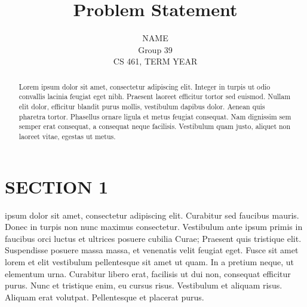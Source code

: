 \documentclass[10pt,peerreview,draftclsnofoot,onecolumn,final,margin=0.75in]{IEEEtran}
\begin{document}
\title{Problem Statement}

\author{NAME \\ Group 39 \\CS 461, TERM YEAR}

\maketitle

\begin{abstract}
Lorem ipsum dolor sit amet, consectetur adipiscing elit. Integer in turpis ut odio convallis 
lacinia feugiat eget nibh. Praesent laoreet efficitur tortor sed euismod. Nullam elit dolor, 
efficitur blandit purus mollis, vestibulum dapibus dolor. Aenean quis pharetra tortor. 
Phasellus ornare ligula et metus feugiat consequat. Nam dignissim sem semper erat consequat, 
a consequat neque facilisis. Vestibulum quam justo, aliquet non laoreet vitae, egestas ut metus.

\end{abstract}
\newpage

\ifCLASSOPTIONcompsoc
{}
\else
\section{SECTION 1}
\label{sec:SECTION 1}
\fi
% 
% 
% 

% 
 ipsum dolor sit amet, consectetur adipiscing elit. Curabitur sed faucibus mauris. 
Donec in turpis non nunc maximus consectetur. Vestibulum ante ipsum primis in faucibus orci luctus et 
ultrices posuere cubilia Curae; Praesent quis tristique elit. Suspendisse posuere massa massa, et venenatis 
velit feugiat eget. Fusce sit amet lorem et elit vestibulum pellentesque sit amet ut quam. In a pretium 
neque, ut elementum urna. Curabitur libero erat, facilisis ut dui non, consequat efficitur purus. Nunc et 
tristique enim, eu cursus risus. Vestibulum et aliquam risus. Aliquam erat volutpat. Pellentesque et placerat 
purus.
\end{document}
